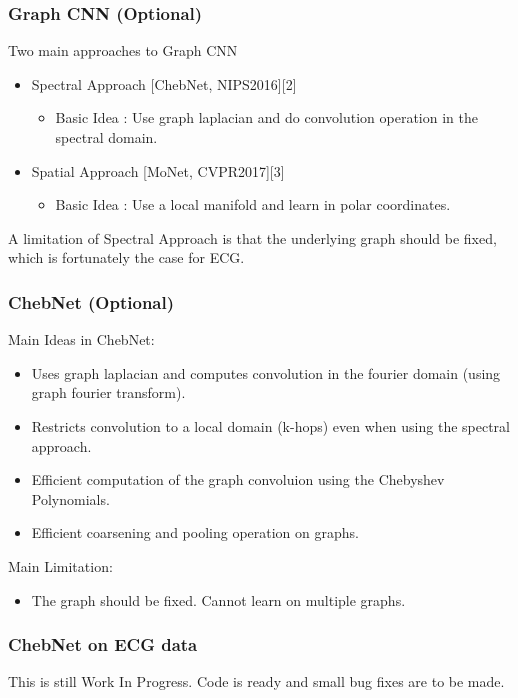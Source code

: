 \documentclass{beamer}
\begin{document}
\begin{frame}
  \frametitle{Graph CNN (Optional)}
  Two main approaches to Graph CNN
  \begin{itemize}
  \item Spectral Approach [ChebNet, NIPS2016][2]
    \begin{itemize}
    \item Basic Idea : Use graph laplacian and do convolution operation in the spectral domain.
    \end{itemize}
  \item Spatial Approach [MoNet, CVPR2017][3]
    \begin{itemize}
    \item Basic Idea : Use a local manifold and learn in polar coordinates.
    \end{itemize}
  \end{itemize}
  A limitation of Spectral Approach is that the underlying graph should be fixed, which is fortunately the case for ECG.
\end{frame}

\begin{frame}
  \frametitle{ChebNet (Optional)}
  Main Ideas in ChebNet:
  \begin{itemize}
  \item Uses graph laplacian and computes convolution in the fourier domain (using graph fourier transform).
  \item Restricts convolution to a local domain (k-hops) even when using the spectral approach.
  \item Efficient computation of the graph convoluion using the Chebyshev Polynomials.
  \item Efficient coarsening and pooling operation on graphs.
  \end{itemize}
  Main Limitation:
  \begin{itemize}
  \item The graph should be fixed. Cannot learn on multiple graphs.
  \end{itemize}
\end{frame}

\begin{frame}
  \frametitle{ChebNet on ECG data}
  This is still Work In Progress. Code is ready and small bug fixes are to be made.
\end{frame}
\end{document}
